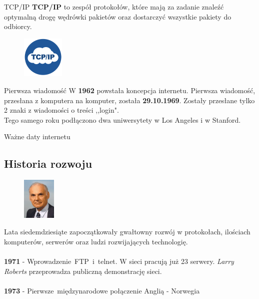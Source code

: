 \documentclass{beamer}
\begin{document}
	\begin{frame}{TCP/IP}
		\textbf{TCP/IP} to zespół protokołów, które mają za zadanie znaleźć optymalną drogę wędrówki pakietów oraz dostarczyć wszystkie pakiety do odbiorcy.
		\begin{figure}
			\flushright
			\vspace{-30pt}
			\includegraphics[height=2cm]{TCPIPDOC.jpg}
			\nocite{TCPIP}
		\end{figure}
	\end{frame}
	\begin{frame}{Pierwsza wiadomość}
		W \textbf{1962} powstała koncepcja internetu. Pierwsza wiadomość, przesłana z komputera na komputer, została \textbf{29.10.1969}. Zostały przesłane tylko 2 znaki z wiadomości o treści ,,login".\cite{TVN} \\
		Tego samego roku podłączono dwa uniwersytety w Los Angeles i w Stanford. \cite{his:int:prez1}
	\end{frame}
	\begin{frame}{Ważne daty internetu}
		\subsection{Historia rozwoju}
		\begin{figure}
			\flushright
			\includegraphics[height=2cm]{Larry_Roberts.jpg}
		\end{figure}
		Lata siedemdziesiąte zapoczątkowały gwałtowny rozwój w protokołach, ilościach komputerów, serwerów oraz ludzi rozwijających technologię.\\ ~ \\
		\textbf{1971} - Wprowadzenie~FTP~i~telnet. W sieci pracują już 23 serwery.  \emph{Larry Roberts} przeprowadza publiczną demonstrację sieci.\\ ~ \\
		\textbf{1973} - Pierwsze~międzynarodowe połączenie Anglią - Norwegia
	\end{frame}
\end{document}

